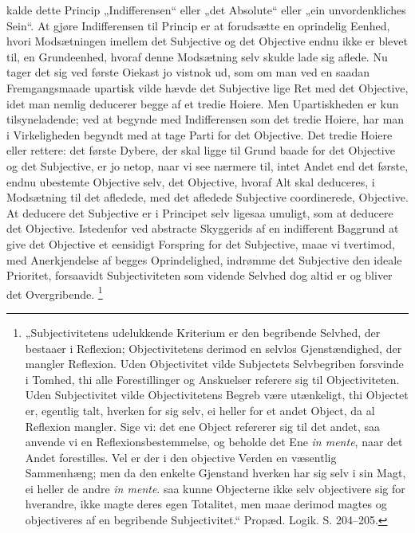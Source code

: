 \documentclass[11pt]{book}
\newcommand{\opage}[1]{\marginnote{\footnotesize\textit{[#1]}}}
\begin{document}
kalde dette
\opage{10} \setcounter{footnote}{0}%
Princip „Indifferensen“ eller „det Absolute“ eller „ein unvordenkliches
Sein“. At gjøre Indifferensen til Princip er at forudsætte en
oprindelig Eenhed, hvori Modsætningen imellem det Subjective og det
Objective endnu ikke er blevet til, en Grundeenhed, hvoraf denne
Modsætning selv skulde lade sig aflede. Nu tager det sig ved første
Oiekast jo vistnok ud, som om man ved en saadan Fremgangsmaade
upartisk vilde hævde det Subjective lige Ret med det Objective, idet
man nemlig deducerer begge af et tredie Hoiere. Men Upartiskheden er
kun tilsyneladende; ved at begynde med Indifferensen som det tredie
Hoiere, har man i Virkeligheden begyndt med at tage Parti for det
Objective. Det tredie Hoiere eller rettere: det første Dybere, der
skal ligge til Grund baade for det Objective og det Subjective, er jo
netop, naar vi see nærmere til, intet Andet end det første, endnu
ubestemte Objective selv, det Objective, hvoraf Alt skal deduceres, i
Modsætning til det afledede, med det afledede Subjective coordinerede,
Objective. At deducere det Subjective er i Principet selv ligesaa
umuligt, som at deducere det Objective. Istedenfor ved abstracte
Skyggerids af en indifferent Baggrund at give det Objective et
eensidigt Forspring for det Subjective, maae vi tvertimod, med
Anerkjendelse af begges Oprindelighed, indrømme det Subjective den
ideale Prioritet, forsaavidt Subjectiviteten som vidende Selvhed dog
altid er og bliver det Overgribende.%
\footnote{„Subjectivitetens udelukkende Kriterium er den begribende
Selvhed, der bestaaer i Reflexion; Objectivitetens derimod en selvlos
Gjenstændighed, der mangler Reflexion. Uden Objectivitet vilde
Subjectets Selvbegriben forsvinde i Tomhed, thi alle Forestillinger og
Anskuelser referere sig til Objectiviteten. Uden Subjectivitet vilde
Objectivitetens Begreb være utænkeligt, thi Objectet er, egentlig talt,
hverken for sig selv, ei heller for et andet Object, da al Reflexion
mangler. Sige vi: det ene Object refererer sig til det andet, saa
anvende vi en Reflexionsbestemmelse, og beholde det Ene
\textit{in mente}, naar det Andet forestilles. Vel er der i den
objective Verden en væsentlig Sammenhæng; men da den enkelte Gjenstand
hverken har sig selv i sin Magt, ei heller de andre \textit{in mente}.
saa kunne Objecterne ikke selv objectivere sig for hverandre, ikke
magte deres egen Totalitet, men maae derimod magtes og objectiveres af
en begribende Subjectivitet.“ Propæd. Logik. S. 204--205.}
\end{document}
